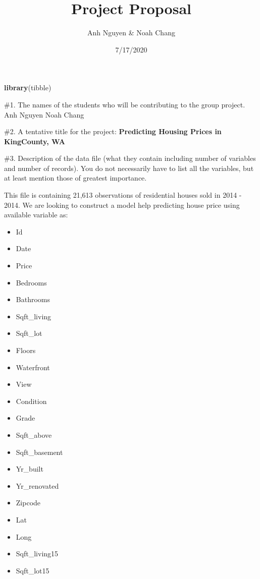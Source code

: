 \documentclass[
]{article}
\title{Project Proposal}
\author{Anh Nguyen \& Noah Chang}
\date{7/17/2020}
\newenvironment{Shaded}{\begin{snugshade}}{\end{snugshade}}
\newcommand{\KeywordTok}[1]{\textcolor[rgb]{0.13,0.29,0.53}{\textbf{#1}}}
\newcommand{\NormalTok}[1]{#1}
\providecommand{\tightlist}{%
  \setlength{\itemsep}{0pt}\setlength{\parskip}{0pt}}
\begin{document}
\maketitle

\begin{Shaded}
\begin{Highlighting}[]
\KeywordTok{library}\NormalTok{(tibble)}
\end{Highlighting}
\end{Shaded}

\#1. The names of the students who will be contributing to the group
project. Anh Nguyen Noah Chang

\#2. A tentative title for the project: \textbf{Predicting Housing
Prices in KingCounty, WA}

\#3. Description of the data file (what they contain including number of
variables and number of records). You do not necessarily have to list
all the variables, but at least mention those of greatest importance.

This file is containing 21,613 observations of residential houses sold
in 2014 - 2014. We are looking to construct a model help predicting
house price using available variable as:

\begin{itemize}
\tightlist
\item
  Id
\item
  Date
\item
  Price
\item
  Bedrooms
\item
  Bathrooms
\item
  Sqft\_living
\item
  Sqft\_lot
\item
  Floors
\item
  Waterfront
\item
  View
\item
  Condition
\item
  Grade
\item
  Sqft\_above
\item
  Sqft\_basement
\item
  Yr\_built
\item
  Yr\_renovated
\item
  Zipcode
\item
  Lat
\item
  Long
\item
  Sqft\_living15
\item
  Sqft\_lot15
\end{itemize}
\end{document}
